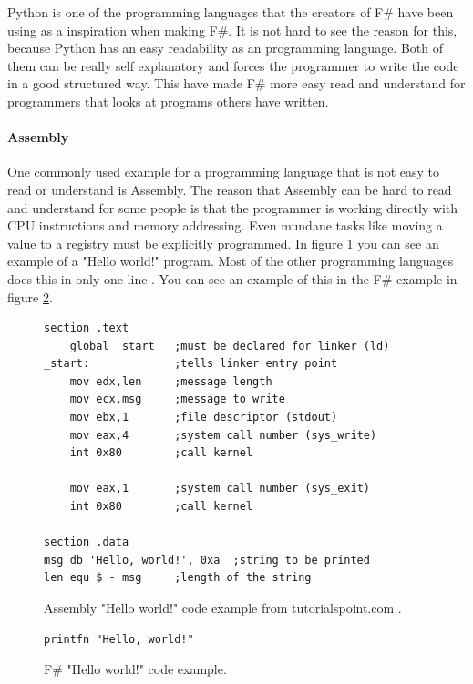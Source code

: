 \documentclass[12pt, a4paper]{article}
\begin{document}
Python is one of the programming languages that the creators of F\# have been using as a inspiration when making F\#. It is not hard to see the reason for this, because Python has an easy readability as an programming language. Both of them can be really self explanatory and forces the programmer to  write the code in a good structured way. This have made F\# more easy read and understand for programmers that looks at programs others have written.

\newpage
\paragraph{Assembly} One commonly used example for a programming language that is not easy to read or understand is Assembly. The reason that Assembly can be hard to read and understand for some people is that the programmer is working directly with CPU instructions and memory addressing. Even mundane tasks like moving a value to a registry must be explicitly programmed. In figure \ref{fig:assemblyExample} you can see an example of a "Hello world!" program. Most of the other programming languages does this in only one line . You can see an example of this in the F\# example in figure \ref{fig:fSharpHelloWorld}.\\

\begin{figure}[!h]
	\begin{lstlisting}
section	.text
    global _start   ;must be declared for linker (ld)
_start:	            ;tells linker entry point
    mov	edx,len     ;message length
    mov	ecx,msg     ;message to write
    mov	ebx,1       ;file descriptor (stdout)
    mov	eax,4       ;system call number (sys_write)
    int	0x80        ;call kernel
	
    mov	eax,1       ;system call number (sys_exit)
    int	0x80        ;call kernel

section	.data
msg db 'Hello, world!', 0xa  ;string to be printed
len equ $ - msg     ;length of the string
	\end{lstlisting}
	\caption{Assembly "Hello world!" code example from tutorialspoint.com \cite{tutorialspoint}.}
	\label{fig:assemblyExample}
\end{figure}

\begin{figure}[!h]
	\begin{lstlisting}
printfn "Hello, world!"
	\end{lstlisting}
	\caption{F\# "Hello world!" code example.}
	\label{fig:fSharpHelloWorld}
\end{figure}
\end{document}
